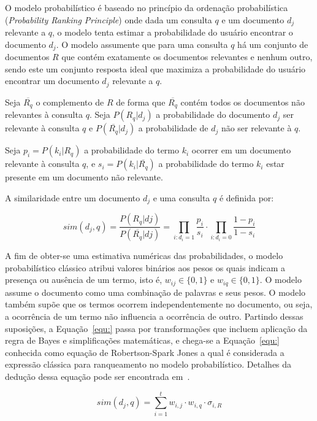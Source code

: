 \documentclass[10pt,a4paper]{article}
\begin{document}
 
 
O modelo probabilístico é baseado no princípio da ordenação probabilística (\textit{Probability Ranking Principle}) onde dada um consulta $q$ e um documento $d_j$ relevante a $q$, o modelo tenta estimar a probabilidade do usuário encontrar o documento $d_j$. O modelo assumente que para uma consulta $q$ há um conjunto de documentos $R$ que contém exatamente os documentos relevantes e nenhum outro, sendo este um conjunto resposta ideal que maximiza a probabilidade do usuário encontrar um documento $d_j$ relevante a $q$. 

Seja $\overline{R_q}$ o complemento de $R$ de forma que $\overline{R_q}$ contém todos os documentos não relevantes à consulta $q$. 
Seja $P(R_q|d_j)$ a probabilidade do documento $d_j$ ser relevante à consulta $q$ e $P(\overline{R_q}|d_j)$ a probabilidade de $d_j$ não ser relevante à $q$. 



\newcommand{\piRel} {P(k_i|R_q)}
\newcommand{\piNRel}{P(k_i|\overline{R_q})}
\newcommand{\termoi}{k_i}

Seja $p_i = \piRel$ a probabilidade do termo $\termoi$ ocorrer em um documento relevante à consulta $q$, 
e $s_i    = \piNRel$ a probabilidade do termo $\termoi$ estar presente em um documento não relevante.



A similaridade entre um documento $d_j$ e uma consulta $q$ é definida por:



\begin{equation}
	sim(d_j, q) = \frac{P(R_q|dj)}{P(\overline{R_q}|dj)} 
%	
	=
%	
	\prod_{i:d_i=1} \frac{p_i}{s_i} 
	\cdot
	\prod_{i:d_i=0} \frac{1 - p_i}{1 - s_i}
	\label{equ:simprob}
\end{equation}



A fim de obter-se uma estimativa numéricas das probabilidades, o modelo probabilístico clássico atribui valores binários aos pesos os quais indicam a presença ou ausência de um termo, isto é, $w_{ij} \in \{0,1\}$ e $w_{iq} \in \{0,1\}$. 
O modelo assume o documento como uma combinação de palavras e seus pesos. 
O modelo também supõe que os termos ocorrem independentemente no documento, ou seja, a ocorrência de um termo não influencia a ocorrência de outro. 
Partindo dessas suposições, a Equação~\ref{equ:} passa por transformações que incluem aplicação da regra de Bayes e simplificações matemáticas, e chega-se a Equação~\ref{equ:} conhecida como equação de Robertson-Spark Jones a qual é considerada a expressão clássica para ranqueamento no modelo probabilístico. Detalhes da dedução dessa equação pode ser encontrada em~\cite{}.


\begin{equation}
	sim(d_j,q) = \sum_{i=1}^{t} w_{i,j} \cdot w_{i,q}  \cdot \sigma_{i,R}
\end{equation}

 
\end{document}
